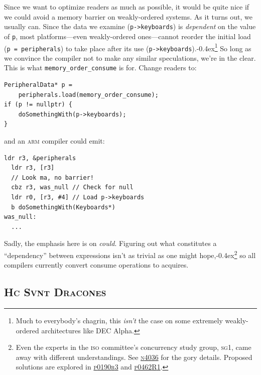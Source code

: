 \documentclass[fontsize=10pt, numbers=endperiod]{scrartcl}
\newcommand{\codesize}{\fontsize{10pt}{12pt}}
\newcommand{\punckern}{\kern-0.4ex}
\newcommand{\monobox}[1]{\mbox{\texttt{#1}}}
\newenvironment{colfigure}
  {\par\vspace{1\baselineskip minus 0.5\baselineskip}\noindent\minipage{\linewidth}}
  {\endminipage\vspace*{1\baselineskip minus 0.7\baselineskip}}
\begin{document}
\begin{multicols*}{2}
Since we want to optimize readers as much as possible,
it would be quite nice if we could avoid a memory barrier
on weakly-ordered systems.
As it turns out, we usually can.
Since the data we examine (\texttt{p->keyboards})
is \emph{dependent} on the value of \texttt{p},
most platforms---even weakly-ordered ones---cannot reorder the initial
load (\texttt{p = peripherals}) to take place after its use
(\texttt{p->keyboards}).\punckern\footnote{Much to everybody's chagrin,
this \emph{isn't} the case on some extremely weakly-ordered architectures like
DEC Alpha.}
So long as we convince the compiler not to make any similar speculations,
we're in the clear.
This is what \monobox{memory\_order\_consume} is for.
Change readers to:
\begin{colfigure}
\begin{verbatim}
PeripheralData* p =
    peripherals.load(memory_order_consume);
if (p != nullptr) {
    doSomethingWith(p->keyboards);
}
\end{verbatim}
\end{colfigure}
and an \textsc{arm} compiler could emit:
\begin{colfigure}
\begin{lstlisting}[language={[ARM]Assembler}]
  ldr r3, &peripherals
  ldr r3, [r3]
  // Look ma, no barrier!
  cbz r3, was_null // Check for null
  ldr r0, [r3, #4] // Load p->keyboards
  b doSomethingWith(Keyboards*)
was_null:
  ...
\end{lstlisting}
\end{colfigure}

Sadly, the emphasis here is on \emph{could}.
Figuring out what constitutes a ``dependency'' between expressions isn't
as trivial as one might hope,\punckern\footnote{Even the experts in
the \textsc{iso} committee's concurrency study group, \textsc{sg}1,
came away with different understandings.
See
\href{http://www.open-std.org/jtc1/sc22/wg21/docs/papers/2014/n4036.pdf}{\textsc{n}4036}
for the gory details.
Proposed solutions are explored in
\href{http://www.open-std.org/jtc1/sc22/wg21/docs/papers/2017/p0190r3.pdf}{\textsc{p}0190\textsc{r}3}
and
\href{http://www.open-std.org/jtc1/sc22/wg21/docs/papers/2017/p0462r1.pdf}{\textsc{p}0462\textsc{R}1}.
}
so all compilers currently convert consume operations to acquires.

\subsection{\textsc{Hc Svnt Dracones}}


\end{multicols*}
\end{document}
